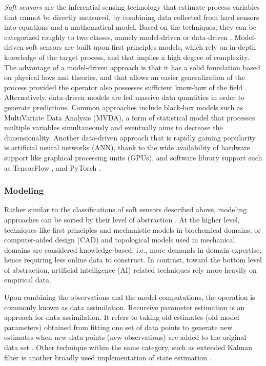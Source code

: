 \documentclass[journal,onecolumn]{IEEEtran} %
\begin{document}
\textit{Soft sensors} are the inferential sensing technology that estimate process variables that cannot be directly measured, by combining data collected from hard sensors into equations and a mathematical model. Based on the techniques, they can be categorized roughly to two classes, namely model-driven or data-driven \cite{Udugama2021}. Model-driven soft sensors are built upon first principles models, which rely on in-depth knowledge of the target process, and that implies a high degree of complexity. The advantage of a model-driven approach is that it has a solid foundation based on physical laws and theories, and that allows an easier generalization of the process provided the operator also possesses sufficient know-how of the field \cite{Rasheed2020}. Alternatively, data-driven models are fed massive data quantities in order to generate predictions. Common approaches include black-box models such as MultiVariate Data Analysis (MVDA), a form of statistical model that processes multiple variables simultaneously and eventually aims to decrease the dimensionality. Another data-driven approach that is rapidly gaining popularity is artificial neural networks (ANN), thank to the wide availability of hardware support like graphical processing units (GPUs), and software library support such as TensorFlow \cite{tensorflow}, and PyTorch \cite{pytorch}.

\subsubsection{Modeling}
Rather similar to the classifications of soft sensors described above, modeling approaches can be sorted by their level of abstraction \cite{Narayanan2020} \cite{Zhou2021}. At the higher level, techniques like first principles and mechanistic models in biochemical domains; or computer-aided design (CAD) and topological models used in mechanical domains \cite{Jiang2021} are considered knowledge-based, i.e., more demands in domain expertise, hence requiring less online data to construct. In contrast, toward the bottom level of abstraction, artificial intelligence (AI) related techniques rely more heavily on empirical data.

Upon combining the observations and the model computations, the operation is commonly known as data assimilation. Recursive parameter estimation is an approach for data assimilation. It refers to taking old estimates (old model parameters) obtained from fitting one set of data points to generate new estimates when new data points (new observations) are added to the original data set \cite{Rutan1990}. Other technique within the same category, such as extended Kalman filter is another broadly used implementation of state estimation \cite{Oisiovici2000} \cite{Kramer2016}.
\end{document}
